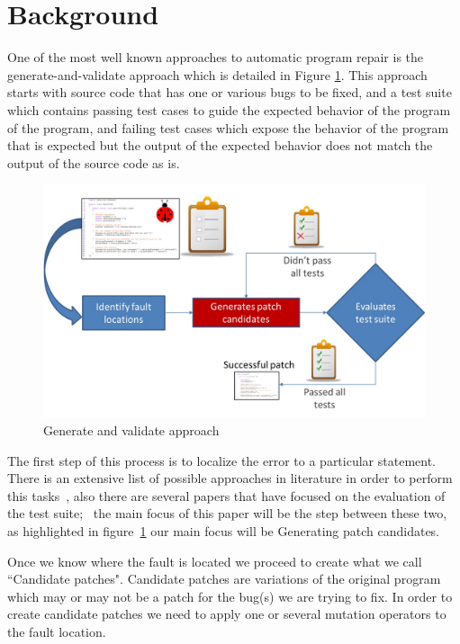 \documentclass[conference]{IEEEtran}
\begin{document}
\section{Background}


One of the most well known approaches to automatic program repair is the
generate-and-validate approach which is detailed in Figure
\ref{fig:generateandvalidate}. This approach starts with source code that
has one or various bugs to be fixed, and a test suite which contains passing
test cases to guide the expected behavior of the program of the program, and failing test 
cases which expose the behavior of the program that is expected but the output
of the expected behavior does not match the output of the source code as is.



\begin{figure}[!h]
  \centering
    \includegraphics[scale=0.25]{Picture1}
  \caption{Generate and validate approach}
  \label{fig:generateandvalidate}
\end{figure}

The first step of this process is to localize the error to a particular 
statement. There is an extensive list of possible approaches in literature in 
order to perform this tasks~\cite{Jones05,Jones02,Chen02,legoues12,Qi13}, also there are several papers that have focused on the evaluation of the test suite;~\cite{QiICSM13,fan15} the main focus of this paper will be the step between these two, as highlighted in figure~\ref{fig:generateandvalidate} our main focus will be Generating patch candidates.

Once we know where the fault is located we proceed to create what we call 
``Candidate patches". Candidate patches are variations of the original program 
which may or may not be a patch for the bug(s) we are trying to fix. In order to 
create candidate patches we need to apply one or several mutation operators to 
the fault location. 
\end{document}
